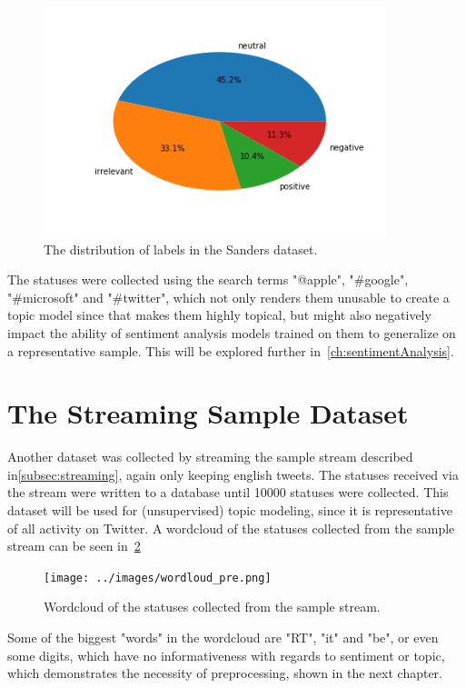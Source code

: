 \begin{figure}
    \centering
    \caption{The distribution of labels in the Sanders dataset.}
    \label{fig:sanders_sentiment}
    \includegraphics[width=10cm]{../images/sanders_sentiment.png} %
\end{figure}

The statuses were collected using the search terms "@apple", "#google", "#microsoft" and "#twitter",
which not only renders them unusable to create a topic model since that makes them highly topical,
but might also negatively impact the ability of sentiment analysis models trained on them to generalize on a representative sample.
This will be explored further in~\ref{ch:sentimentAnalysis}.

\section{The Streaming Sample Dataset}
\label{sec:streamingSampleDataset}

Another dataset was collected by streaming the sample stream described in\ref{subsec:streaming},
again only keeping english tweets.
The statuses received via the stream were written to a database until 10000 statuses were collected.
This dataset will be used for (unsupervised) topic modeling, since it is representative of all activity on Twitter.
A wordcloud of the statuses collected from the sample stream can be seen in~\ref{fig:wordloud_pre}~

\begin{figure}
    \centering
    \caption{Wordcloud of the statuses collected from the sample stream.}
    \label{fig:wordloud_pre}
    \texttt{[image: ../images/wordloud\_pre.png]} %
\end{figure}

Some of the biggest "words" in the wordcloud are "RT", "it" and "be",
or even some digits, which have no informativeness with regards to sentiment or topic,
which demonstrates the necessity of preprocessing, shown in the next chapter.


